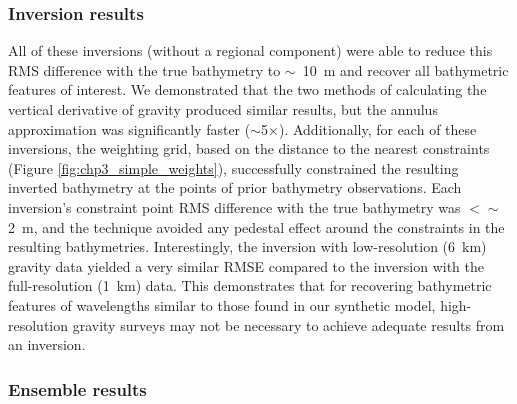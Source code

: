\subsubsection{Inversion results}

All of these inversions (without a regional component) were able to reduce this RMS difference with the true bathymetry to $\sim$~10~m and recover all bathymetric features of interest. We demonstrated that the two methods of calculating the vertical derivative of gravity produced similar results, but the annulus approximation was significantly faster ($\sim$5$\times$). Additionally, for each of these inversions, the weighting grid, based on the distance to the nearest constraints (Figure \ref{fig:chp3_simple_weights}), successfully constrained the resulting inverted bathymetry at the points of prior bathymetry observations. Each inversion's constraint point RMS difference with the true bathymetry was $<\sim$2~m, and the technique avoided any pedestal effect around the constraints in the resulting bathymetries. Interestingly, the inversion with low-resolution (6~km) gravity data yielded a very similar RMSE compared to the inversion with the full-resolution (1~km) data. This demonstrates that for recovering bathymetric features of wavelengths similar to those found in our synthetic model, high-resolution gravity surveys may not be necessary to achieve adequate results from an inversion. 

\subsubsection{Ensemble results}

